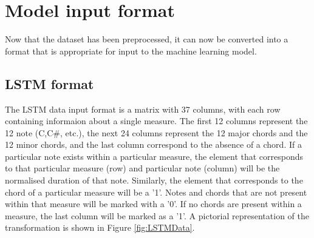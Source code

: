 


\section{Model input format}
Now that the dataset has been preprocessed, it can now be converted into a format that is appropriate for input to the machine learning model.

\subsection{LSTM format}
The LSTM data input format is a matrix with 37 columns, with each row containing informaion about a single measure. The first 12 columns represent the 12 note (C,C\#, etc.), the next 24 columns represent the 12 major chords and the 12 minor chords, and the last column correspond to the absence of a chord. If a particular note exists within a particular measure, the element that corresponds to that particular measure (row) and particular note (column) will be the normalised duration of that note. Similarly, the element that corresponds to the chord of a particular measure will be a '1'. Notes and chords that are not present within that measure will be marked with a '0'. If no chords are present within a measure, the last column will be marked as a '1'. A pictorial representation of the transformation is shown in Figure \ref{fig:LSTMData}.

